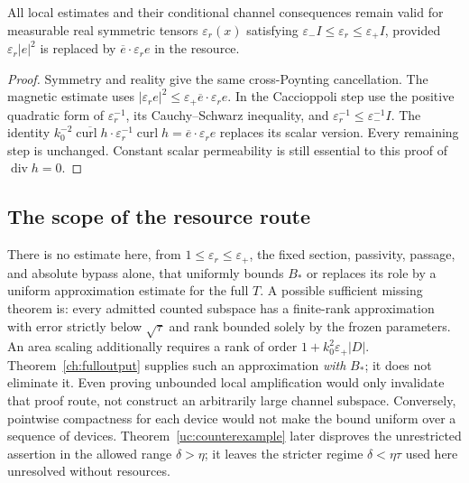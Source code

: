 \begin{corollary}
\label{ch:anisotropy}
All local estimates and their conditional channel consequences remain
valid for measurable real symmetric tensors $\varepsilon_r(x)$ satisfying
$\varepsilon_-I\leq\varepsilon_r\leq\varepsilon_+I$, provided
$\varepsilon_r|e|^2$ is replaced by
$\overline e\cdot\varepsilon_r e$ in the resource.
\end{corollary}
\begin{proof}
Symmetry and reality give the same cross-Poynting cancellation.
The magnetic estimate uses
$|\varepsilon_r e|^2\leq\varepsilon_+
\overline e\cdot\varepsilon_r e$.
In the Caccioppoli step use the positive quadratic form of
$\varepsilon_r^{-1}$, its Cauchy--Schwarz inequality, and
$\varepsilon_r^{-1}\leq\varepsilon_-^{-1}I$.
The identity
$k_0^{-2}\overline{\operatorname{curl}h}\cdot
\varepsilon_r^{-1}\operatorname{curl}h=
\overline e\cdot\varepsilon_r e$ replaces its scalar version.
Every remaining step is unchanged.  Constant scalar permeability is still
essential to this proof of $\operatorname{div}h=0$.
\end{proof}

\subsection{The scope of the resource route}
\label{ch:open}

\begin{remark}
\label{ch:missing}
There is no estimate here, from $1\leq\varepsilon_r\leq\varepsilon_+$,
the fixed section, passivity, passage, and absolute bypass alone, that
uniformly bounds $B_*$ or replaces its role by a uniform approximation
estimate for the full $T$.  A possible sufficient missing theorem is:
every admitted counted subspace has a finite-rank approximation with error
strictly below $\sqrt\tau$ and rank bounded solely by the frozen parameters.
An area scaling additionally requires a rank of order
$1+k_0^2\varepsilon_+|D|$.  Theorem~\ref{ch:fulloutput} supplies such an
approximation \emph{with} $B_*$; it does not eliminate it.  Even proving
unbounded local amplification would only invalidate that proof route,
not construct an arbitrarily large channel subspace.  Conversely,
pointwise compactness for each device would not make the bound uniform
over a sequence of devices. Theorem~\ref{uc:counterexample} later disproves
the unrestricted assertion in the allowed range $\delta>\eta$; it leaves
the stricter regime $\delta<\eta\tau$ used here unresolved without resources.
\end{remark}
